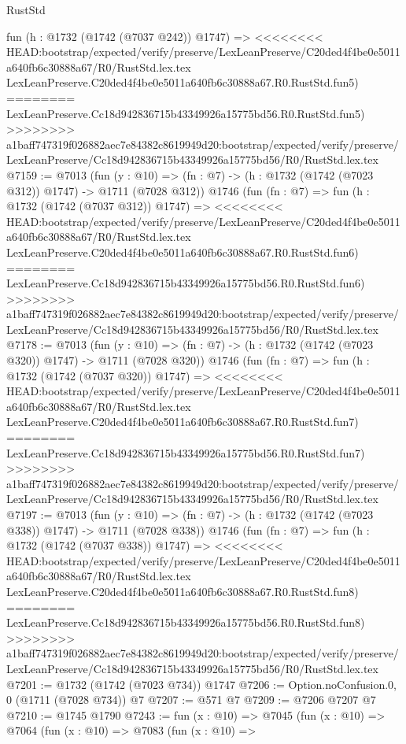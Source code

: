 \begin{lexlean}{RustStd}
\begin{coremodule}
{\begin{coremodule}
{{{{{{{{{{{{{    fun (h : @1732 (@1742 (@7037 @242)) @1747) =>
<<<<<<<< HEAD:bootstrap/expected/verify/preserve/LexLeanPreserve/C20ded4f4be0e5011a640fb6c30888a67/R0/RustStd.lex.tex
    LexLeanPreserve.C20ded4f4be0e5011a640fb6c30888a67.R0.RustStd.fun5)
========
    LexLeanPreserve.Cc18d942836715b43349926a15775bd56.R0.RustStd.fun5)
>>>>>>>> a1baff747319f026882aec7e84382c8619949d20:bootstrap/expected/verify/preserve/LexLeanPreserve/Cc18d942836715b43349926a15775bd56/R0/RustStd.lex.tex
@7159 := @7013
    (fun (y : @10) => (fn : @7) -> (h : @1732 (@1742 (@7023 @312)) @1747) -> @1711 (@7028 @312))
    @1746
    (fun (fn : @7) =>
    fun (h : @1732 (@1742 (@7037 @312)) @1747) =>
<<<<<<<< HEAD:bootstrap/expected/verify/preserve/LexLeanPreserve/C20ded4f4be0e5011a640fb6c30888a67/R0/RustStd.lex.tex
    LexLeanPreserve.C20ded4f4be0e5011a640fb6c30888a67.R0.RustStd.fun6)
========
    LexLeanPreserve.Cc18d942836715b43349926a15775bd56.R0.RustStd.fun6)
>>>>>>>> a1baff747319f026882aec7e84382c8619949d20:bootstrap/expected/verify/preserve/LexLeanPreserve/Cc18d942836715b43349926a15775bd56/R0/RustStd.lex.tex
@7178 := @7013
    (fun (y : @10) => (fn : @7) -> (h : @1732 (@1742 (@7023 @320)) @1747) -> @1711 (@7028 @320))
    @1746
    (fun (fn : @7) =>
    fun (h : @1732 (@1742 (@7037 @320)) @1747) =>
<<<<<<<< HEAD:bootstrap/expected/verify/preserve/LexLeanPreserve/C20ded4f4be0e5011a640fb6c30888a67/R0/RustStd.lex.tex
    LexLeanPreserve.C20ded4f4be0e5011a640fb6c30888a67.R0.RustStd.fun7)
========
    LexLeanPreserve.Cc18d942836715b43349926a15775bd56.R0.RustStd.fun7)
>>>>>>>> a1baff747319f026882aec7e84382c8619949d20:bootstrap/expected/verify/preserve/LexLeanPreserve/Cc18d942836715b43349926a15775bd56/R0/RustStd.lex.tex
@7197 := @7013
    (fun (y : @10) => (fn : @7) -> (h : @1732 (@1742 (@7023 @338)) @1747) -> @1711 (@7028 @338))
    @1746
    (fun (fn : @7) =>
    fun (h : @1732 (@1742 (@7037 @338)) @1747) =>
<<<<<<<< HEAD:bootstrap/expected/verify/preserve/LexLeanPreserve/C20ded4f4be0e5011a640fb6c30888a67/R0/RustStd.lex.tex
    LexLeanPreserve.C20ded4f4be0e5011a640fb6c30888a67.R0.RustStd.fun8)
========
    LexLeanPreserve.Cc18d942836715b43349926a15775bd56.R0.RustStd.fun8)
>>>>>>>> a1baff747319f026882aec7e84382c8619949d20:bootstrap/expected/verify/preserve/LexLeanPreserve/Cc18d942836715b43349926a15775bd56/R0/RustStd.lex.tex
@7201 := @1732 (@1742 (@7023 @734)) @1747
@7206 := Option.noConfusion.{0, 0} (@1711 (@7028 @734)) @7
@7207 := @571 @7
@7209 := @7206 @7207 @7
@7210 := @1745 @1790
@7243 := fun (x : @10) =>
  @7045
    (fun (x : @10) =>
    @7064
      (fun (x : @10) =>
      @7083
        (fun (x : @10) =>
}}}}}}}}}}}}}
\end{coremodule}}
\end{coremodule}
\end{lexlean}
